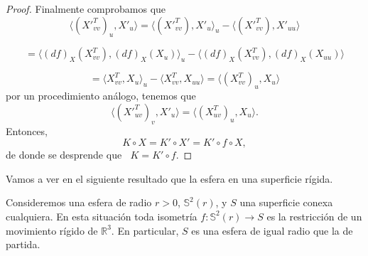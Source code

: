 \begin{proof}
	Finalmente comprobamos que
	${ }$\\
	\[
		\langle (X'^{T}_{vv})_u, X'_u \rangle = \langle (X'^{T}_{vv}), X'_u \rangle _u - \langle (X'^{T}_{vv}), X'_{uu} \rangle
	\]
	
	\[
		= \langle (df)_X(X^{T}_{vv}), (df)_X(X_u) \rangle _u - \langle (df)_X(X^{T}_{vv}), (df)_X(X_{uu}) \rangle
	\]
	
	\[
		= \langle X^{T}_{vv}, X_u \rangle _u - \langle X^{T}_{vv}, X_{uu} \rangle = \langle (X^{T}_{vv})_u, X_u \rangle
	\]
	${ }$\\
	por un procedimiento análogo, tenemos que
	${ }$\\
	\[
		\langle (X'^{T}_{uv})_v, X'_u \rangle = \langle (X^{T}_{uv})_u, X_u \rangle.
	\]
	${ }$\\	
	
	Entonces,
	${ }$\\
	\[
		K \circ X = K' \circ X' = K' \circ f \circ X,
	\]
	${ }$\\
	de donde se desprende que   $\;\; K = K' \circ f$.
	
\end{proof}
${ }$\\

Vamos a ver en el siguiente resultado que la esfera en una superficie rígida.
${ }$\\

\begin{teorema}
	Consideremos una esfera de radio $r>0$, $\mathbb{S}^2(r)$, y $S$ una superficie conexa cualquiera. En esta situación toda isometría $f : \mathbb{S}^2(r) \to S$ es la restricción de un movimiento rígido de $\mathbb{R}^3$. En particular, $S$ es una esfera de igual radio que la de partida.
\end{teorema}

